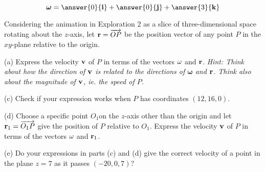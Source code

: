 \documentclass{ximera}
\begin{document}
\begin{question}  \label{Qhfnbyt:Cross}
\[
\boldsymbol{\omega} = \answer{0}{\bf i} + \answer{0}{\bf j} + \answer{3}{\bf k}
\]
\end{question}

\begin{question}  \label{Qnjy55:Cross}
Considering the animation in Exploration 2 as a slice of three-dimensional space rotating about the $z$-axis, let ${\bf r} = \overrightarrow{OP}$ be the position vector of any point $P$ in the $xy$-plane relative to the origin.

(a) Express the velocity ${\bf v}$ of $P$ in terms of the vectors ${\bf\omega}$ and ${\bf r}$. \it{Hint:} Think about how the direction of ${\bf v}$ is related to the directions of $\boldsymbol{\omega}$ and ${\bf r}$. Think also about the magnitude of ${\bf v}$, ie. the speed of $P$.

(c) Check if your expression works when $P$ has coordinates $(12, 16,0)$.

(d) Choose a specific point $O_1$on the $z$-axis other than the origin and let ${\bf r}_1 = \overrightarrow{O_1P}$ give the position of $P$ relative to $O_1$. Express the velocity ${\bf v}$ of $P$ in terms of the vectors ${\bf\omega}$ and ${\bf r}_1$. 


(e) Do your expressions in parts (c) and (d) give the correct velocity of a point in the plane $z=7$ as it passes $(-20,0,7)$?


\end{question}
\end{document}

